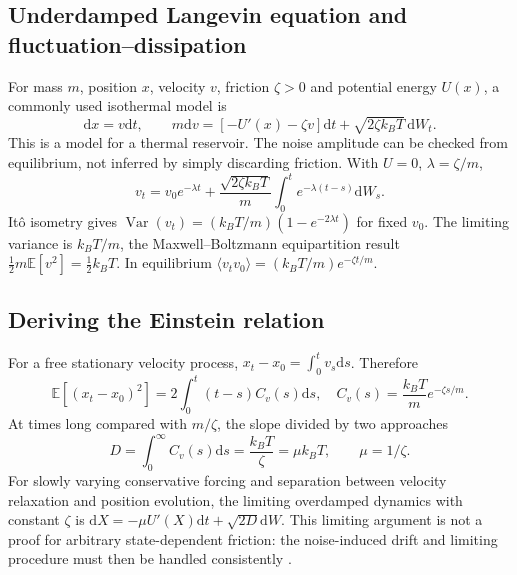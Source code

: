 \documentclass[11pt,a4paper]{article}
\newcommand{\dd}{\mathrm d}
\newcommand{\E}{\mathbb E}
\theoremstyle{remark}\newtheorem*{remark}{Physical interpretation}
\begin{document}
\subsection{Underdamped Langevin equation and fluctuation--dissipation}
For mass $m$, position $x$, velocity $v$, friction $\zeta>0$ and potential energy $U(x)$, a commonly used isothermal model is
\begin{equation}\dd x=v\dd t,\qquad m\dd v=[-U'(x)-\zeta v]\dd t+\sqrt{2\zeta k_BT}\,\dd W_t.\end{equation}
This is a model for a thermal reservoir. The noise amplitude can be checked from equilibrium, not inferred by simply discarding friction. With $U=0$, $\lambda=\zeta/m$,
\begin{equation}v_t=v_0e^{-\lambda t}+\frac{\sqrt{2\zeta k_BT}}{m}\int_0^te^{-\lambda(t-s)}\dd W_s.\end{equation}
It\^o isometry gives $\operatorname{Var}(v_t)=(k_BT/m)(1-e^{-2\lambda t})$ for fixed $v_0$. The limiting variance is $k_BT/m$, the Maxwell--Boltzmann equipartition result $\frac12m\E[v^2]=\frac12k_BT$. In equilibrium $\langle v_t v_0\rangle=(k_BT/m)e^{-\zeta t/m}$.

\subsection{Deriving the Einstein relation}
For a free stationary velocity process, $x_t-x_0=\int_0^t v_s\dd s$. Therefore
\begin{equation}\E[(x_t-x_0)^2]=2\int_0^t(t-s)C_v(s)\dd s,\quad C_v(s)=\frac{k_BT}{m}e^{-\zeta s/m}.\end{equation}
At times long compared with $m/\zeta$, the slope divided by two approaches
\begin{equation}\label{einstein}D=\int_0^\infty C_v(s)\dd s=\frac{k_BT}{\zeta}=\mu k_BT,\qquad \mu=1/\zeta.\end{equation}
For slowly varying conservative forcing and separation between velocity relaxation and position evolution, the limiting overdamped dynamics with constant $\zeta$ is $\dd X=-\mu U'(X)\dd t+\sqrt{2D}\dd W$. This limiting argument is not a proof for arbitrary state-dependent friction: the noise-induced drift and limiting procedure must then be handled consistently \cite{gardiner,risken}.
\end{document}
